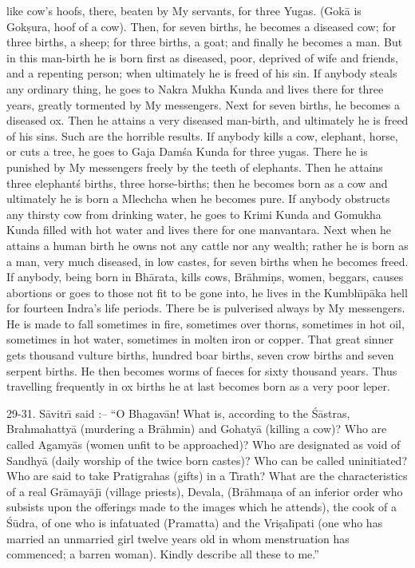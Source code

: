 like cow's hoofs, there, beaten by My servants, for three Yugas. (Gok\=a is Gok\d{s}ura, hoof of a cow). Then, for seven births, he becomes a diseased cow; for three births, a sheep; for three births, a goat; and finally he becomes a man. But in this man-birth he is born first as diseased, poor, deprived of wife and friends, and a repenting person; when ultimately he is freed of his sin. If anybody steals any ordinary thing, he goes to Nakra Mukha Kunda and lives there for three years, greatly tormented by My messengers. Next for seven births, he becomes a diseased ox. Then he attains a very diseased man-birth, and ultimately he is freed of his sins. Such are the horrible results. If anybody kills a cow, elephant, horse, or cuts a tree, he goes to Gaja Dam\'sa Kunda for three yugas. There he is punished by My messengers freely by the teeth of elephants. Then he attains three elephant\'s births, three horse-births; then he becomes born as a cow and ultimately he is born a Mlechcha when he becomes pure. If anybody obstructs any thirsty cow from drinking water, he goes to Krimi Kunda and Gomukha Kunda filled with hot water and lives there for one manvantara. Next when he attains a human birth he owns not any cattle nor any wealth; rather he is born as a man, very much diseased, in low castes, for seven births when he becomes freed. If anybody, being born in Bh\=arata, kills cows, Br\=ahmi\d{n}s, women, beggars, causes abortions or goes to those not fit to be gone into, he lives in the Kumbh\={\i}p\=aka hell for fourteen Indra's life periods. There be is pulverised always by My messengers. He is made to fall sometimes in fire, sometimes over thorns, sometimes in hot oil, sometimes in hot water, sometimes in molten iron or copper. That great sinner gets thousand vulture births, hundred boar births, seven crow births and seven serpent births. He then becomes worms of faeces for sixty thousand years. Thus travelling frequently in ox births he at last becomes born as a very poor leper.

29-31. S\=avitr\={\i} said :-- ``O Bhagav\=an! What is, according to the \'S\=astras, Brahmahatty\=a (murdering a Br\=ahmin) and Gohaty\=a (killing a cow)? Who are called Agamy\=as (women unfit to be approached)? Who are designated as void of Sandhy\=a (daily worship of the twice born castes)? Who can be called uninitiated? Who are said to take Pratigrahas (gifts) in a T\={\i}rath? What are the characteristics of a real Gr\=amay\=aj\={\i} (village priests), Devala, (Br\=ahma\d{n}a of an inferior order who subsists upon the offerings made to the images which he attends), the cook of a \'S\=udra, of one who is infatuated (Pramatta) and the Vri\d{s}al\={\i}pati (one who has married an unmarried girl twelve years old in whom menstruation has commenced; a barren woman). Kindly describe all these to me.''

